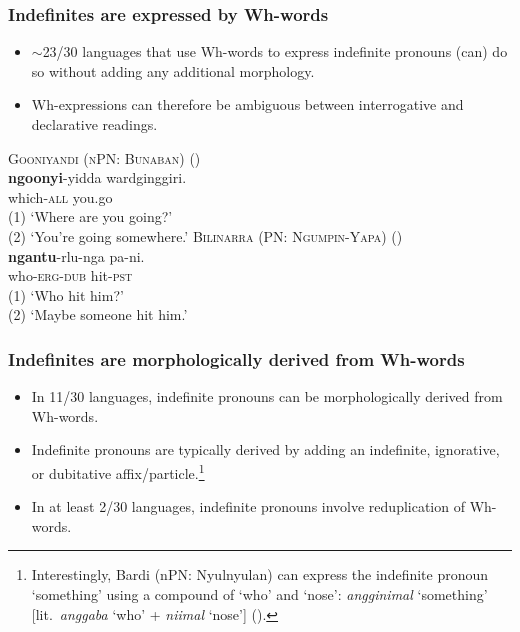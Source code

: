 \documentclass{article}
\begin{document}
\subsubsection{Indefinites are expressed by  Wh-words}
\begin{itemize}
\item $\sim$23/30 languages that use Wh-words to express indefinite pronouns (can) do so without adding any additional morphology.
\item Wh-expressions can therefore be ambiguous between interrogative and declarative readings.
\end{itemize}

\begin{exe}
  \ex \textsc{Gooniyandi (nPN: Bunaban)} (\citealt[147]{mcgregor90})\\
  \gll \textbf{ngoonyi}-yidda wardginggiri.\\
  which-\textsc{all} you.go\\
  \glt (1)  `Where are you going?' \\
  (2) `You're going somewhere.'
  \ex \textsc{Bilinarra (PN: Ngumpin-Yapa)} (\citealt[37]{nordlinger90})\\
  \gll \textbf{ngantu}-rlu-nga pa-ni.\\
  who-\textsc{erg-dub} hit-\textsc{pst}\\
  \glt (1) `Who hit him?'\\
  (2) `Maybe someone hit him.'
\end{exe}

\subsubsection{Indefinites are morphologically derived from Wh-words}
\begin{itemize}
\item In 11/30 languages, indefinite pronouns can be morphologically derived from Wh-words.
\item Indefinite pronouns are typically derived by adding an indefinite, ignorative, or dubitative affix/particle.\footnote{Interestingly, Bardi (nPN: Nyulnyulan) can express the indefinite pronoun `something' using a compound of `who' and `nose': \textit{angginimal} `something' [lit.\ \textit{anggaba} `who' + \textit{niimal} `nose'] (\citealt[321]{bowern12}). }
\item In at least 2/30 languages, indefinite pronouns involve reduplication of Wh-words.
\end{itemize}
\end{document}

